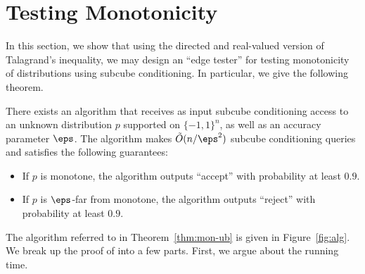 
\section{Testing Monotonicity}

In this section, we show that using the directed and real-valued version of Talagrand's inequality, we may design an ``edge tester'' for testing monotonicity of distributions using subcube conditioning. In particular, we give the following theorem.
\begin{theorem}\label{thm:mon-ub}
    There exists an algorithm that receives as input subcube conditioning access to an unknown distribution $p$ supported on $\{-1,1\}^n$, as well as an accuracy parameter $\eps$. The algorithm makes $\tilde{O}(n/\eps^2)$ subcube conditioning queries and satisfies the following guarantees:
    \begin{itemize}
        \item If $p$ is monotone, the algorithm outputs ``accept'' with probability at least $0.9$.
        \item If $p$ is $\eps$-far from monotone, the algorithm outputs ``reject'' with probability at least $0.9$.
    \end{itemize}
\end{theorem}

The algorithm referred to in Theorem~\ref{thm:mon-ub} is given in Figure~\ref{fig:alg}.
We break up the proof of 
into a few parts. First, we argue about the running time.

